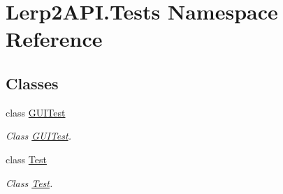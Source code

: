 \hypertarget{namespace_lerp2_a_p_i_1_1_tests}{}\section{Lerp2\+A\+P\+I.\+Tests Namespace Reference}
\label{namespace_lerp2_a_p_i_1_1_tests}
\subsection*{Classes}
\begin{DoxyCompactItemize}
\item 
class \hyperlink{class_lerp2_a_p_i_1_1_tests_1_1_g_u_i_test}{G\+U\+I\+Test}
\begin{DoxyCompactList}\small\item\em Class \hyperlink{class_lerp2_a_p_i_1_1_tests_1_1_g_u_i_test}{G\+U\+I\+Test}. \end{DoxyCompactList}\item 
class \hyperlink{class_lerp2_a_p_i_1_1_tests_1_1_test}{Test}
\begin{DoxyCompactList}\small\item\em Class \hyperlink{class_lerp2_a_p_i_1_1_tests_1_1_test}{Test}. \end{DoxyCompactList}\end{DoxyCompactItemize}
